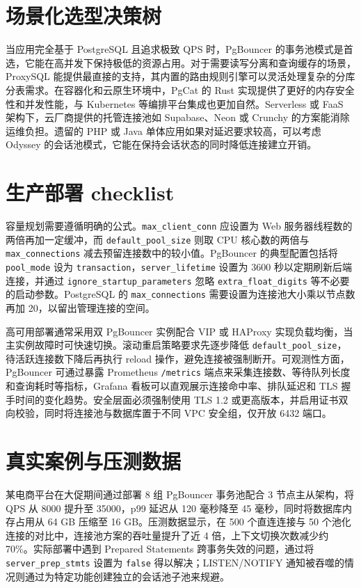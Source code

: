 \chapter{场景化选型决策树}
当应用完全基于 PostgreSQL 且追求极致 QPS 时，PgBouncer 的事务池模式是首选，它能在高并发下保持极低的资源占用。对于需要读写分离和查询缓存的场景，ProxySQL 能提供最直接的支持，其内置的路由规则引擎可以灵活处理复杂的分库分表需求。在容器化和云原生环境中，PgCat 的 Rust 实现提供了更好的内存安全性和并发性能，与 Kubernetes 等编排平台集成也更加自然。Serverless 或 FaaS 架构下，云厂商提供的托管连接池如 Supabase、Neon 或 Crunchy 的方案能消除运维负担。遗留的 PHP 或 Java 单体应用如果对延迟要求较高，可以考虑 Odyssey 的会话池模式，它能在保持会话状态的同时降低连接建立开销。\par
\chapter{生产部署 checklist}
容量规划需要遵循明确的公式。\texttt{max\_{}client\_{}conn} 应设置为 Web 服务器线程数的两倍再加一定缓冲，而 \texttt{default\_{}pool\_{}size} 则取 CPU 核心数的两倍与 \texttt{max\_{}connections} 减去预留连接数中的较小值。PgBouncer 的典型配置包括将 \texttt{pool\_{}mode} 设为 \texttt{transaction}，\texttt{server\_{}lifetime} 设置为 3600 秒以定期刷新后端连接，并通过 \texttt{ignore\_{}startup\_{}parameters} 忽略 \texttt{extra\_{}float\_{}digits} 等不必要的启动参数。PostgreSQL 的 \texttt{max\_{}connections} 需要设置为连接池大小乘以节点数再加 20，以留出管理连接的空间。\par
高可用部署通常采用双 PgBouncer 实例配合 VIP 或 HAProxy 实现负载均衡，当主实例故障时可快速切换。滚动重启策略要求先逐步降低 \texttt{default\_{}pool\_{}size}，待活跃连接数下降后再执行 reload 操作，避免连接被强制断开。可观测性方面，PgBouncer 可通过暴露 Prometheus \texttt{/metrics} 端点来采集连接数、等待队列长度和查询耗时等指标，Grafana 看板可以直观展示连接命中率、排队延迟和 TLS 握手时间的变化趋势。安全层面必须强制使用 TLS 1.2 或更高版本，并启用证书双向校验，同时将连接池与数据库置于不同 VPC 安全组，仅开放 6432 端口。\par
\chapter{真实案例与压测数据}
某电商平台在大促期间通过部署 8 组 PgBouncer 事务池配合 3 节点主从架构，将 QPS 从 8000 提升至 35000，p99 延迟从 120 毫秒降至 45 毫秒，同时将数据库内存占用从 64 GB 压缩至 16 GB。压测数据显示，在 500 个直连连接与 50 个池化连接的对比中，连接池方案的吞吐量提升了近 4 倍，上下文切换次数减少约 70\%{}。实际部署中遇到 Prepared Statements 跨事务失效的问题，通过将 \texttt{server\_{}prep\_{}stmts} 设置为 \texttt{false} 得以解决；LISTEN/NOTIFY 通知被吞噬的情况则通过为特定功能创建独立的会话池子池来规避。\par
